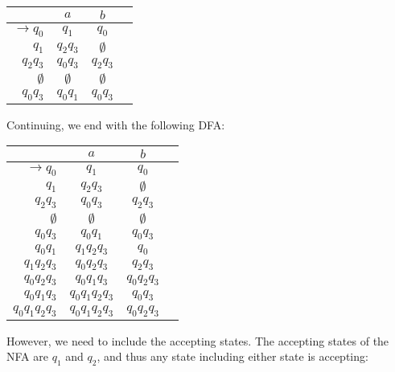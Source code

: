 \begin{center}\begin{tabular}{r|c c r}
         & \(a\) & \(b\) & \\\bottomrule
    \(\to q_0\) & \(q_1\) & \(q_0\) &  \\
          \(q_1\) & \(q_2q_3\) & \(\emptyset\) & \\
          \(q_2q_3\) & \(q_0q_3\) & \(q_2q_3\) & \\
          \(\emptyset\) & \(\emptyset\) & \(\emptyset\) &\\
          \(q_0q_3\) & \(q_0q_1\) & \(q_0q_3\) & 
\end{tabular}\end{center}

Continuing, we end with the following DFA:

\begin{center}\begin{tabular}{r|c c r}
         & \(a\) & \(b\) & \\\bottomrule
    \(\to q_0\) & \(q_1\) & \(q_0\) &  \\
          \(q_1\) & \(q_2q_3\) & \(\emptyset\) & \\
          \(q_2q_3\) & \(q_0q_3\) & \(q_2q_3\) & \\
          \(\emptyset\) & \(\emptyset\) & \(\emptyset\) &\\
          \(q_0q_3\) & \(q_0q_1\) & \(q_0q_3\) & \\
          \(q_0q_1\) & \(q_1q_2q_3\) & \(q_0\) & \\
          \(q_1q_2q_3\) & \(q_0q_2q_3\) & \(q_2q_3\) & \\
          \(q_0q_2q_3\) & \(q_0q_1q_3\) & \(q_0q_2q_3\) & \\
          \(q_0q_1q_3\) & \(q_0q_1q_2q_3\) & \(q_0q_3\) & \\
          \(q_0q_1q_2q_3\) & \(q_0q_1q_2q_3\) & \(q_0q_2q_3\) & \\
\end{tabular}\end{center}

However, we need to include the accepting states. The accepting states of the NFA are \(q_1\) and \(q_2\), and thus any state including either state is accepting:

